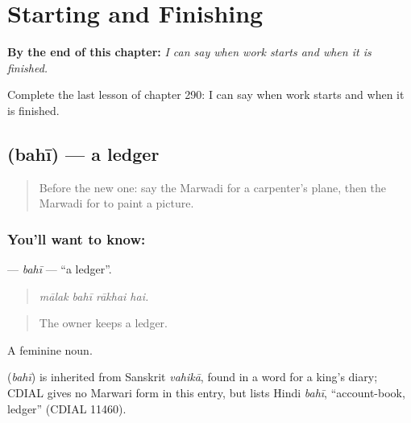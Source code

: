 
\chapter{Starting and Finishing}
\label{ch:mw-starting-and-finishing}

\begin{chapteropening}
\textbf{By the end of this chapter:} \emph{I can say when work starts and when it is finished.}

Complete the last lesson of chapter 290: I can say when work starts and when it is finished.
\end{chapteropening}

\section[\texorpdfstring{\mw{बही} (bahī)}{बही (bahī)}]{ (bahī) — a ledger}

\label{lesson:MW-C290-bahi}



\begin{quote}
Before the new one: say the Marwadi for a carpenter's plane, then the Marwadi for to paint a picture.
\end{quote}

\subsection*{You'll want to know: }
\textbf{} — \emph{bahī} — \textquotedblleft{}a ledger\textquotedblright{}.

\begin{quote}
   
\end{quote}

\begin{quote}
\emph{mālak bahī rākhai hai.}
\end{quote}

\begin{quote}
The owner keeps a ledger.
\end{quote}

A feminine noun.

\begin{cousinweb}
\textbf{} (\emph{bahī}) is inherited from Sanskrit \emph{vahikā}, found in a word for a king's diary; CDIAL gives no Marwari form in this entry, but lists Hindi \emph{bahī}, \textquotedblleft{}account-book, ledger\textquotedblright{} (CDIAL 11460).
\end{cousinweb}

